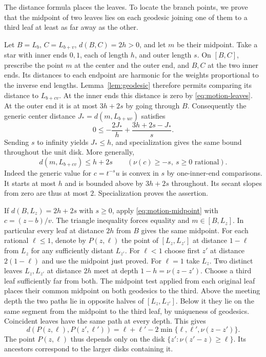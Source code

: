 The distance formula places the leaves. To locate the branch points,
we prove that the midpoint of two leaves lies on each geodesic joining
one of them to a third leaf at least as far away as the other.

Let \(B=L_b\), \(C=L_{b+v}\), \(d(B,C)=2h>0\),
and let \(m\) be their midpoint. Take a star with inner ends \(0,1\),
each of length \(h\), and outer length \(s\). On \([B,C]\), prescribe
the point \(m\) at the center and the outer end, and \(B,C\) at the
two inner ends. Its distances to each endpoint are harmonic for the
weights proportional to the inverse end lengths. Lemma~\ref{lem:geodesic}
therefore permits comparing its distance to \(L_{b+cv}\). At the inner
ends this distance is zero by \eqref{eq:motion-leaves}. At the outer
end it is at most \(3h+2s\) by going through \(B\). Consequently the
generic center distance \(J_*=d(m,L_{b+uv})\) satisfies
\[
  0\le-\frac{2J_*}{h}+\frac{3h+2s-J_*}{s}.
\]
Sending \(s\) to infinity yields \(J_*\le h\), and specialization
gives the same bound throughout the unit disk. More generally,
\begin{equation}\label{eq:motion-midpoint}
 d(m,L_{b+cv})\le h+2s \qquad(\nu(c)\ge-s,\ s\ge0 \text{ rational}).
\end{equation}
Indeed the generic value for \(c=t^{-s}u\) is convex in \(s\) by
one-inner-end comparisons. It starts at most \(h\) and is bounded
above by \(3h+2s\) throughout. Its secant slopes from zero are thus
at most \(2\). Specialization proves the assertion.

If \(d(B,L_z)=2h+2s\) with \(s\ge0\), apply
\eqref{eq:motion-midpoint} with \(c=(z-b)/v\). The triangle inequality
forces equality and \(m\in[B,L_z]\). In particular every leaf at
distance \(2h\) from \(B\) gives the same midpoint. For each rational
\(\ell\le1\), denote by \(P(z,\ell)\) the point of \([L_z,L_{z'}]\)
at distance \(1-\ell\) from \(L_z\) for any sufficiently distant
\(L_{z'}\). For \(\ell<1\) choose first \(z'\) at distance
\(2(1-\ell)\) and use the midpoint just proved. For \(\ell=1\)
take \(L_z\). Two distinct leaves \(L_z,L_{z'}\) at distance \(2h\)
meet at depth \(1-h=\nu(z-z')\). Choose a third leaf sufficiently
far from both. The midpoint test applied from each original leaf
places their common midpoint on both geodesics to the third. Above
the meeting depth the two paths lie in opposite halves of
\([L_z,L_{z'}]\). Below it they lie on the same segment from the
midpoint to the third leaf, by uniqueness of geodesics. Coincident
leaves have the same path at every depth. This gives
\begin{equation}\label{eq:motion-tree}
 d(P(z,\ell),P(z',\ell'))=
       \ell+\ell'-2\min\{\ell,\ell',\nu(z-z')\}.
\end{equation}
The point \(P(z,\ell)\) thus depends only on the disk
\(\{z':\nu(z'-z)\ge\ell\}\). Its ancestors correspond to the larger
disks containing it.

